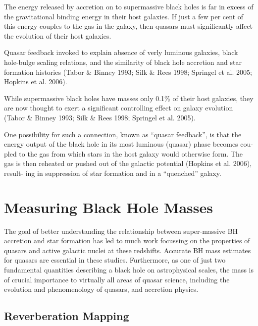 The energy released by accretion on to supermassive black holes is far in excess of the gravitational binding energy in their host galaxies. 
If just a few per cent of this energy couples to the gas in the galaxy, then quasars must significantly affect the evolution of their host galaxies. 

Quasar feedback invoked to explain absence of verly luminous galaxies, black hole-bulge scaling relations, and the similarity of black hole accretion and star formation histories (Tabor \& Binney 1993; Silk \& Rees 1998; Springel et al. 2005; Hopkins et al. 2006).

While supermassive black holes have masses only 0.1\% of their host galaxies, they are now thought to exert a significant controlling effect on galaxy evolution (Tabor \& Binney 1993; Silk \& Rees 1998; Springel et al. 2005).

One possibility for such a connection, known as “quasar feedback”, is that the energy output of the black hole in its most luminous (quasar) phase becomes cou- pled to the gas from which stars in the host galaxy would otherwise form.
The gas is then reheated or pushed out of the galactic potential (Hopkins et al. 2006), result- ing in suppression of star formation and in a “quenched” galaxy. 


\section{Measuring Black Hole Masses}

The goal of better understanding the relationship between super-massive BH accretion and star formation has led to much work focussing on the properties of quasars
and active galactic nuclei at these redshifts.
Accurate BH mass estimates for quasars are essential in these studies. 
Furthermore, as one of just two fundamental quantities describing a black hole on astrophysical
scales, the mass is of crucial importance to virtually all areas of quasar science, including the evolution and phenomenology of quasars, and accretion physics.

\subsection{Reverberation Mapping}

